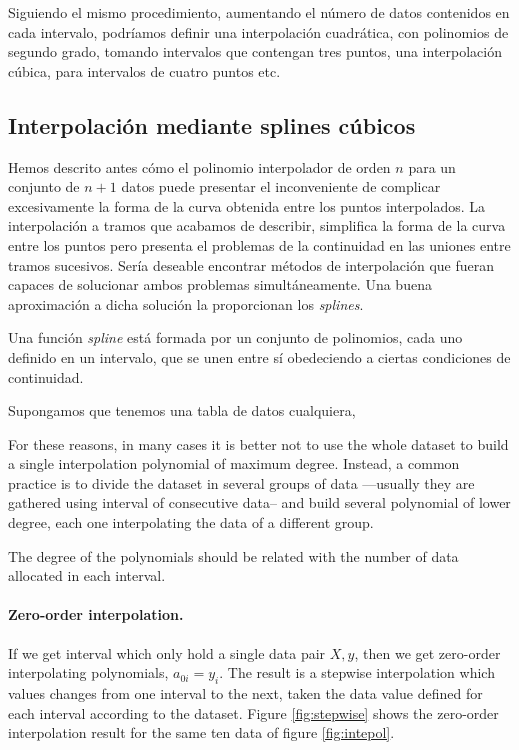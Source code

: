 \begin{paracol}{2}
Siguiendo el mismo procedimiento, aumentando el número de datos contenidos en cada intervalo, podríamos definir una interpolación cuadrática, con polinomios de segundo grado, tomando intervalos que contengan tres puntos, una interpolación cúbica, para intervalos de cuatro puntos etc.

\subsection{Interpolación mediante splines cúbicos} 
Hemos descrito antes cómo el polinomio interpolador de orden $n$ para un conjunto de $n+1$ datos puede presentar el inconveniente de complicar excesivamente la forma de  la curva obtenida entre los puntos interpolados. La interpolación a tramos que acabamos de describir, simplifica la forma de la curva entre los puntos pero presenta el problemas de la continuidad en las uniones entre tramos sucesivos. Sería deseable encontrar métodos de interpolación que fueran capaces de solucionar ambos problemas simultáneamente. Una buena aproximación a dicha solución la proporcionan los \emph{splines}.

Una función \emph{spline} está formada por un conjunto de polinomios, cada uno definido en un intervalo, que se unen entre sí obedeciendo a ciertas condiciones de continuidad.

Supongamos que tenemos una tabla de datos cualquiera,

\switchcolumn
For these reasons, in many cases it is better not to use the whole dataset to build a single interpolation polynomial of maximum degree. Instead, a common practice is to divide the dataset in several groups of data ---usually they are gathered using interval of consecutive data-- and build several polynomial of lower degree, each one interpolating the data of  a different group.

The  degree of the polynomials should be related with the number of data allocated in each interval.

\paragraph{Zero-order interpolation.}  If we get interval which only hold a single  data pair $X,y$, then we get zero-order interpolating polynomials, $a_{0i} = y_i$. The result is a stepwise interpolation which values changes from one interval to the next,  taken the data value defined for each interval according to the dataset.   Figure \ref{fig:stepwise} shows the zero-order interpolation result for the same ten data of figure \ref{fig:intepol}. 


\end{paracol}
